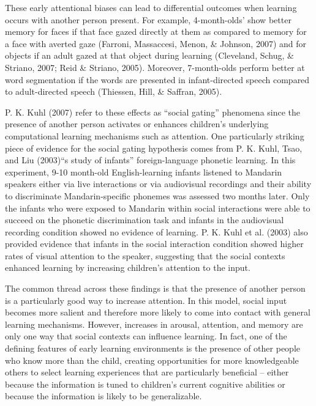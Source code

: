 \documentclass[english,man]{apa6}
\theoremstyle{definition}
\theoremstyle{definition}
\theoremstyle{definition}
\theoremstyle{remark}
\begin{document}
These early attentional biases can lead to differential outcomes when
learning occurs with another person present. For example, 4-month-olds'
show better memory for faces if that face gazed directly at them as
compared to memory for a face with averted gaze (Farroni, Massaccesi,
Menon, \& Johnson, 2007) and for objects if an adult gazed at that
object during learning (Cleveland, Schug, \& Striano, 2007; Reid \&
Striano, 2005). Moreover, 7-month-olds perform better at word
segmentation if the words are presented in infant-directed speech
compared to adult-directed speech (Thiessen, Hill, \& Saffran, 2005).

P. K. Kuhl (2007) refer to these effects as \enquote{social gating}
phenomena since the presence of another person activates or enhances
children's underlying computational learning mechanisms such as
attention. One particularly striking piece of evidence for the social
gating hypothesis comes from P. K. Kuhl, Tsao, and Liu (2003)\enquote{s
study of infants} foreign-language phonetic learning. In this
experiment, 9-10 month-old English-learning infants listened to Mandarin
speakers either via live interactions or via audiovisual recordings and
their ability to discriminate Mandarin-specific phonemes was assessed
two months later. Only the infants who were exposed to Mandarin within
social interactions were able to succeed on the phonetic discrimination
task and infants in the audiovisual recording condition showed no
evidence of learning. P. K. Kuhl et al. (2003) also provided evidence
that infants in the social interaction condition showed higher rates of
visual attention to the speaker, suggesting that the social contexts
enhanced learning by increasing children's attention to the input.

The common thread across these findings is that the presence of another
person is a particularly good way to increase attention. In this model,
social input becomes more salient and therefore more likely to come into
contact with general learning mechanisms. However, increases in arousal,
attention, and memory are only one way that social contexts can
influence learning. In fact, one of the defining features of early
learning environments is the presence of other people who know more than
the child, creating opportunities for more knowledgeable others to
select learning experiences that are particularly beneficial -- either
because the information is tuned to children's current cognitive
abilities or because the information is likely to be generalizable.
\end{document}
